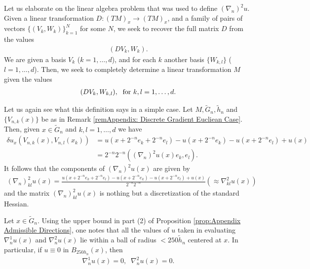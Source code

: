 \documentclass[11pt,reqno]{amsart}
\numberwithin{equation}{section}
\theoremstyle{plain}
\begin{document}
Let us elaborate on the linear algebra problem that was used to define $(\nabla_n)^2u$. Given a linear transformation $D:(TM)_x\to (TM)_x$, and a family of pairs of vectors $\{(V_k,W_k)\}_{k=1}^N$ for some $N$, we seek to recover the full matrix $D$ from the values
\begin{align*}
  (DV_k,W_k).
\end{align*}
We are given a basis $V_k$ ($k=1,\ldots,d$), and for each $k$ another basis $\{W_{k,l}\}$ ($l=1,\ldots,d$). Then, we seek to completely determine a linear transformation $M$ given the values
\begin{align*}
  (DV_k,W_{k,l}), \;\textnormal{ for } k,l=1,\ldots,d.  
\end{align*}


\begin{rem}
  Let us again see what this definition says in a simple case. Let $M, \tilde G_n, \tilde h_n$ and $\{V_{n,k}(x)\}$ be as in Remark \ref{remAppendix: Discrete Gradient Eucliean Case}. Then, given $x\in \tilde G_n$ and $k,l=1,\ldots,d$ we have
  \begin{align*}
    \delta u_x(V_{n,k}(x),V_{n,l}(x_k)) & = u(x+2^{-n}e_k+2^{-n}e_l)-u(x+2^{-n}e_k)-u(x+2^{-n}e_l)+u(x)\\
      & =  2^{-n}2^{-n}( (\nabla_n)^2u(x)e_k,e_l).
  \end{align*}
  It follows that the components of $(\nabla_n)^2u(x)$ are given by
  \begin{align*}
    (\nabla_n)_{kl}^2u(x) = \frac{u(x+2^{-n}e_k+2^{-n}e_l)-u(x+2^{-n}e_k)-u(x+2^{-n}e_l)+u(x)}{2^{-n}2^{-n}} (\approx \nabla^2_{kl}u(x) )  
  \end{align*}
  and the matrix $(\nabla_n)_{kl}^2u(x)$ is nothing but a discretization of the standard Hessian.

\end{rem}

\begin{rem}\label{rem:Appendix Locality of Discrete Derivatives}
  Let $x \in \tilde G_n$. Using the upper bound in part (2) of Proposition \ref{prop:Appendix Admissible Directions}, one notes that all the values of $u$ taken in evaluating $\nabla_n^1 u(x)$ and $\nabla_n^2u(x)$ lie within a ball of radius $<250\tilde h_n$ centered at $x$. In particular,  if $u\equiv 0$ in $B_{250h_n}(x)$, then
  \begin{align*}
    \nabla_n^1u(x) = 0,\;\;\nabla_n^2u(x) = 0.	  	   
  \end{align*}	  

\end{rem}  
  
\end{document}
